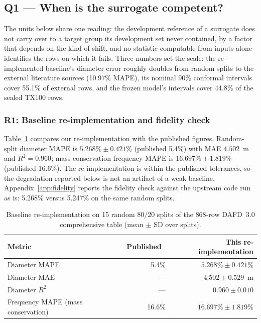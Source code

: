 \documentclass[11pt,a4paper]{article}
\newcommand{\um}{\textmu m}
\newcommand{\tox}{TX100}
\begin{document}
\subsection{Q1 --- When is the surrogate competent?}
\label{sec:q1}
The units below share one reading: the development reference of a surrogate
does not carry over to a target group its development set never contained,
by a factor that depends on the kind of shift, and no statistic computable
from inputs alone identifies the rows on which it fails. Three numbers set the
scale: the re-implemented baseline's diameter error roughly doubles from random
splits to the external literature sources (10.97\% MAPE), its nominal 90\%
conformal intervals cover 55.1\% of external rows, and the frozen model's
intervals cover 44.8\% of the sealed \tox{} rows.

\subsubsection{R1: Baseline re-implementation and fidelity check}
\label{sec:r1}
Table~\ref{tab:repro} compares our re-implementation with the published figures.
Random-split diameter MAPE is $5.268\% \pm 0.421\%$ (published 5.4\%) with
MAE $4.502$~\um{} and $R^2=0.960$; mass-conservation frequency MAPE is
$16.697\% \pm 1.819\%$ (published 16.6\%). The re-implementation is within the
published tolerances, so the degradation reported below is not an artifact of
a weak baseline. Appendix~\ref{app:fidelity} reports the fidelity check
against the upstream code run as is: 5.268\% versus 5.247\% on the same
random splits.

\begin{table}[t]
\centering\small
\caption{Baseline re-implementation on 15 random 80/20 splits of the 868-row
DAFD~3.0 comprehensive table (mean $\pm$ SD over splits).}
\label{tab:repro}
\begin{tabular}{lrr}
\toprule
Metric & Published~\cite{lashkaripour2024} & This re-implementation \\
\midrule
Diameter MAPE & 5.4\% & $5.268\% \pm 0.421\%$ \\
Diameter MAE & --- & $4.502 \pm 0.529$~\um \\
Diameter $R^2$ & --- & $0.960 \pm 0.010$ \\
Frequency MAPE (mass conservation) & 16.6\% & $16.697\% \pm 1.819\%$ \\
\bottomrule
\end{tabular}
\end{table}
\end{document}
